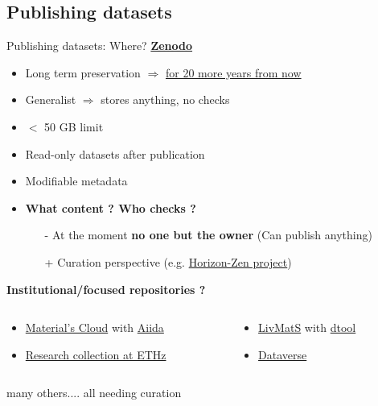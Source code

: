 \documentclass[10pt,compress,serif,aspectratio=169]{beamer}
\begin{document}
\subsection{Publishing datasets}
\begin{frame}{Publishing datasets: Where?}
\textbf{\href{https://zenodo.org/}{Zenodo}}
\begin{itemize}
  \item Long term preservation $\Rightarrow$ \href{https://about.zenodo.org/policies/}{for 20 more years from now}
  \item Generalist $\Rightarrow$ stores anything, no checks
  \item $<$ 50 GB limit 
  \item Read-only datasets after publication
  \item Modifiable metadata 
\pause
\item \textbf{What content ? Who checks ?}
\begin{itemize}
  \item[-] At the moment \textbf{no one but the owner} (Can publish anything)
  \item[+] Curation perspective (e.g. \href{https://about.zenodo.org/projects/horizon-zen/}{Horizon-Zen project}) 
 \end{itemize}
\pause
\end{itemize}
\vfill
\textbf{Institutional/focused repositories ?}

\begin{columns}[t]
        \begin{column}{.5\textwidth}
\begin{itemize}
  \item \href{https://www.materialscloud.org/home}{Material's Cloud} with \href{https://www.aiida.net/}{Aiida}

  \item \href{https://www.research-collection.ethz.ch/}{Research collection at ETHz}
\end{itemize}
        \end{column}
        \begin{column}{.5\textwidth}
\begin{itemize}
  \item \href{https://livmats-data.vm.uni-freiburg.de/}{LivMatS} with \href{https://github.com/jic-dtool/dtool}{dtool}
  \item \href{https://dataverse.org/installations}{Dataverse} 
\end{itemize}
        \end{column}
    \end{columns}

\vfill

\begin{center}
many others.... \pause \alert{all needing curation}
\end{center}
\end{frame}
\end{document}
